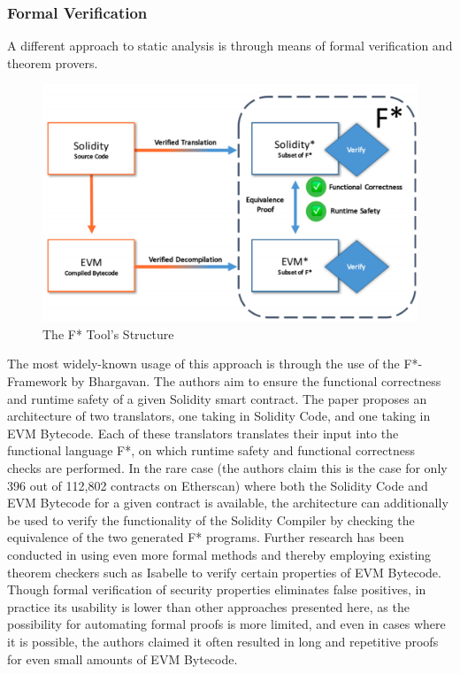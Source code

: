 \documentclass[letterpaper,twocolumn,10pt]{article}
\begin{document}
\subsubsection{Formal Verification}
A different approach to static analysis is through means of formal verification and theorem provers. 

\begin{figure}
\begin{center}
\includegraphics[scale=0.2]{Fstar}
\end{center}
\caption{\label{fig:oyente} The F* Tool's Structure}
\end{figure}


The most widely-known usage of this approach is through the use of the F*-Framework by Bhargavan. The authors aim to ensure the functional correctness and runtime safety of a given Solidity smart contract. The paper proposes an architecture of two translators, one taking in Solidity Code, and one taking in EVM Bytecode. Each of these translators translates their input into the functional language F*, on which runtime safety and functional correctness checks are performed. In the rare case (the authors claim this is the case for only 396 out of 112,802 contracts on Etherscan) where both the Solidity Code and EVM Bytecode for a given contract is available, the architecture can additionally be used to verify the functionality of the Solidity Compiler by checking the equivalence of the two generated F* programs. 
Further research has been conducted in using even more formal methods and thereby employing existing theorem checkers such as Isabelle to verify certain properties of EVM Bytecode. Though formal verification of security properties eliminates false positives, in practice its usability is lower than other approaches presented here, as the possibility for automating formal proofs is more limited, and even in cases where it is possible, the authors claimed it often resulted in long and repetitive proofs for even small amounts of EVM Bytecode.
\end{document}
